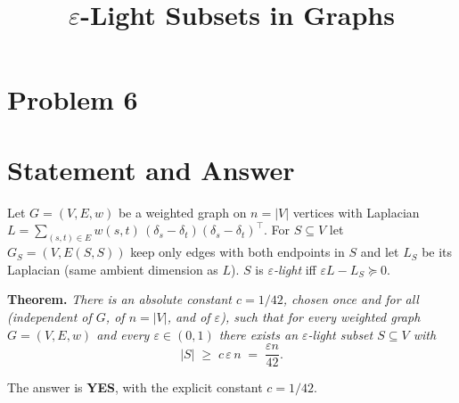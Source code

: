 \clearpage
\section*{Problem 6}
\begingroup
\hypersetup{colorlinks=true,
            linkcolor=blue!50!black,
            citecolor=blue!50!black,
            urlcolor=blue!50!black}
\newcommand{\qsixR}{\mathbb{R}}
\newcommand{\qsixE}{\mathbb{E}}
\newcommand{\qsixPr}{\mathbb{P}}
\newcommand{\qsixeps}{\varepsilon}
\newcommand{\qsixTr}{\operatorname{Tr}}
\newcommand{\qsixTrs}{\operatorname{Tr}_{\sigma}}
\newcommand{\qsixdiag}{\operatorname{diag}}
\newcommand{\qsixopnorm}[1]{\left\lVert #1 \right\rVert}
\newcommand{\qsixdel}{\delta}
\newcommand{\qsixSpan}{\operatorname{span}}
\newcommand{\qsixim}{\operatorname{im}}
\newcommand{\qsixrank}{\operatorname{rank}}
\newcommand{\qsixtL}{\widetilde{L}}
\newcommand{\qsixLt}{L^{\dagger}}
\newcommand{\qsixLth}{L^{\dagger/2}}
\newcommand{\qsixBarrier}[2]{\mathcal{B}^{#1}_{#2}}
\newtheorem{qsixtheorem}{Theorem}
\newtheorem{qsixlemma}[qsixtheorem]{Lemma}
\newtheorem{qsixproposition}[qsixtheorem]{Proposition}
\newtheorem{qsixclaim}[qsixtheorem]{Claim}
\title{$\qsixeps$-Light Subsets in Graphs}
\author{}
\date{}
\maketitle


\section*{Statement and Answer}

Let $G=(V,E,w)$ be a weighted graph on $n=|V|$ vertices with Laplacian
$L=\sum_{(s,t)\in E}w(s,t)\,(\delta_s-\delta_t)(\delta_s-\delta_t)^{\!\top}$.
For $S\subseteq V$ let $G_S=(V,E(S,S))$ keep only edges with both endpoints in
$S$ and let $L_S$ be its Laplacian (same ambient dimension as $L$). $S$ is
\emph{$\qsixeps$-light} iff $\qsixeps L - L_S\succeq 0$.

\medskip
\noindent\textbf{Theorem.} \emph{There is an absolute constant $c=1/42$,
chosen once and for all \textup{(}independent of $G$, of $n=|V|$, and of
$\qsixeps$\textup{)}, such that for every weighted graph $G=(V,E,w)$ and every
$\qsixeps\in(0,1)$ there exists an $\qsixeps$-light subset $S\subseteq V$ with}
\[
  |S|\;\ge\;c\,\qsixeps\,n\;=\;\frac{\qsixeps n}{42}.
\]

\medskip
\noindent The answer is \textbf{YES}, with the explicit constant $c=1/42$.

